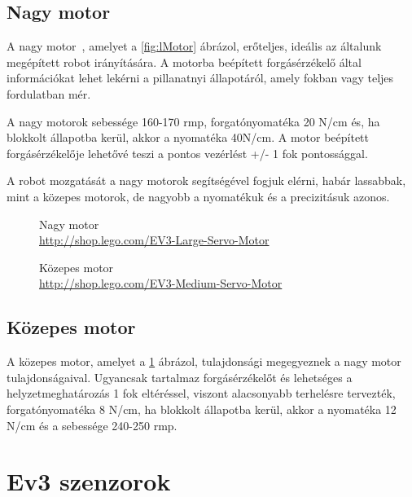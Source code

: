 \subsection{Nagy motor}
A nagy motor~\cite{sensorMotor}, amelyet a \ref{fig:lMotor} ábrázol, erőteljes, ideális az általunk megépített robot irányítására. A motorba beépített forgásérzékelő által  információkat lehet lekérni a pillanatnyi állapotáról, amely fokban vagy teljes fordulatban mér.

A nagy motorok sebessége 160-170 rmp, forgatónyomatéka 20 N/cm és, ha blokkolt állapotba kerül, akkor a nyomatéka 40N/cm. A motor beépített forgásérzékelője lehetővé teszi a pontos vezérlést +/- 1 fok pontossággal.

A robot mozgatását a nagy motorok segítségével fogjuk elérni, habár lassabbak, mint a közepes motorok, de nagyobb a nyomatékuk és a precizitásuk azonos.

\begin{figure}[!htb]
	\centering
	\captionsetup{justification=centering,margin=1.5cm}
	\caption[Nagy motor]
	{Nagy motor\\
	\href{http://shop.lego.com/en-CA/EV3-Large-Servo-Motor-45502}{http://shop.lego.com/EV3-Large-Servo-Motor}}
	\label{fig:lMotor}
	\endminipage
	\captionsetup{justification=centering,margin=1.5cm}
	\caption[Közepes motor]
	{Közepes motor\\
	\href{http://shop.lego.com/en-CA/EV3-Medium-Servo-Motor-45503}{http://shop.lego.com/EV3-Medium-Servo-Motor}}
	\label{fig:mMotor}
	\endminipage
\end{figure}

\subsection{Közepes motor}
A közepes motor, amelyet a \ref{fig:mMotor} ábrázol, tulajdonsági megegyeznek a nagy motor tulajdonságaival. Ugyancsak tartalmaz forgásérzékelőt és lehetséges a helyzetmeghatározás 1 fok eltéréssel, viszont alacsonyabb terhelésre tervezték, forgatónyomatéka 8 N/cm, ha blokkolt állapotba kerül, akkor a nyomatéka 12 N/cm és a sebessége 240-250 rmp.

\section{Ev3 szenzorok}\label{sec:ROBOT:szenzorok}

